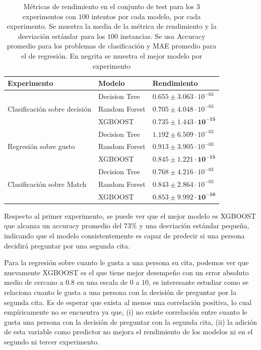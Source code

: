\begin{table}[h!]
\centering
\begin{tabular}{l l l}
\toprule
Experimento & Modelo & Rendimiento\\ 
\midrule
\multirow{3}{*}{Clasificación sobre decisión} & Decision Tree & $0.655 \pm 3.063 \cdot 10^{-03}$ \\
                                              & Random Forest & $0.705 \pm 4.048 \cdot 10^{-03} $ \\ 
                                              & XGBOOST & $\mathbf{0.735 \pm 1.443 \cdot 10^{-15}}$ \\
\midrule
\multirow{3}{*}{Regresión sobre gusto} & Decision Tree & $1.192 \pm 6.509 \cdot 10^{-03}$  \\
                                       & Random Forest & $0.913 \pm 3.905 \cdot 10^{-03}$\\
                                       & XGBOOST & $\mathbf{0.845 \pm 1.221 \cdot 10^{-15}}$ \\
\midrule
\multirow{3}{*}{Clasificación sobre Match} & Decision Tree & $0.768  \pm  4.216 \cdot 10^{-03}$ \\
                                           & Random Forest & $0.843 \pm 2.864 \cdot 10^{-03}$ \\
                                           & XGBOOST & $\mathbf{0.853 \pm 9.992 \cdot 10^{-16}}$ \\
\bottomrule
\end{tabular}
\caption{Métricas de rendimiento en el conjunto de test para los $3$ experimentos con $100$ intentos por cada modelo, por cada experimento. Se muestra la media de la métrica de rendimiento y la desviación estándar para los $100$ instancias. Se usa Accuracy promedio para los problemas de clasificación y MAE promedio para el de regresión. En negrita se muestra el mejor modelo por experimento}
\label{tab:tree_results}
\end{table}


Respecto al primer experimento, se puede ver que el mejor modelo es XGBOOST que alcanza un accuracy promedio del $73\%$ y una desviación estándar pequeña, indicando que el modelo consistentemente es capaz de predecir si una persona decidirá preguntar por una segunda cita.

Para la regresión sobre cuanto le gusta a una persona su cita, podemos ver que nuevamente XGBOOST es el que tiene mejor desempeño con un error absoluto medio de cercano a $0.8$ en una escala de $0$ a $10$, es interesante estudiar como se relaciona cuanto le gusta a una persona con la decisión de preguntar por la segunda cita. Es de esperar que exista al menos una correlación positiva, lo cual empíricamente no se encuentra ya que, (i) no existe correlación entre cuanto le gusta una persona con la decisión de preguntar con la segunda cita, (ii) la adición de esta variable como predictor no mejora el rendimiento de los modelos ni en el segundo ni tercer experimento.

